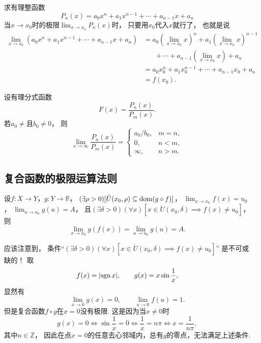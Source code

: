 \begin{example}\label{example:极限.有理整函数在一点的极限}
求有理整函数\[
	P_n(x) = a_0 x^n + a_1 x^{n-1} + \dotsb + a_{n-1} x + a_n
\]当\(x\to x_0\)时的极限\(\lim_{x\to x_0} P_n(x)\)时，
只要用\(x_0\)代入\(x\)就行了，
也就是说\begin{align*}
	\lim_{x \to x_0} (a_0 x^n + a_1 x^{n-1} + \dotsb + a_{n-1} x + a_n)
	&= a_0 \left(\lim_{x \to x_0} x\right)^n
		+ a_1 \left(\lim_{x \to x_0} x\right)^{n-1} \\
	&\hspace{20pt}+ \dotsb
		+ a_{n-1} \left(\lim_{x \to x_0} x\right)
		+ a_n \\
	&= a_0 x_0^n + a_1 x_0^{n-1} + \dotsb + a_{n-1} x_0 + a_n \\
	&= f(x_0).
\end{align*}
\end{example}

\begin{example}
设有理分式函数\[
	F(x) = \frac{P_n(x)}{P_m(x)}.
\]
若\(a_0\neq\)且\(b_0\neq0\)，
则\[
	\lim_{x\to\infty} \frac{P_n(x)}{P_m(x)}
	= \left\{ \begin{array}{cl}
		a_0/b_0, & m=n, \\
		0, & n<m, \\
		\infty, & n>m.
	\end{array} \right.
\]
\end{example}

\subsection{复合函数的极限运算法则}
\begin{theorem}
设\(f\colon X\to Y\)，\(g\colon Y\to\mathbb{R}\)，
\((\exists\rho>0)[\mathring{U}(x_0,\rho) \subseteq \operatorname{dom}(g \circ f)]\)，
\(\lim_{x \to x_0} f(x) = u_0\)，
\(\lim_{u \to u_0} g(u) = A\)，
且\((\exists\delta>0)(\forall x)[x\in\mathring{U}(x_0,\delta) \implies f(x)\neq u_0]\)，
则\[
	\lim_{x \to x_0} g(f(x))
	= \lim_{u \to u_0} g(u)
	= A.
\]
\end{theorem}

\begin{remark}
应该注意到，
条件“\((\exists\delta>0)(\forall x)[x\in\mathring{U}(x_0,\delta) \implies f(x)\neq u_0]\)”
是不可或缺的！
取\[
	f(x) = \abs{\operatorname{sgn} x}, \qquad
	g(x) = x \sin\frac1x,
\]
显然有\[
	\lim_{x\to0} g(x) = 0, \qquad
	\lim_{u\to0} f(u) = 1.
\]
但是复合函数\(f \circ g\)在\(x=0\)没有极限.
这是因为当\(x\neq0\)时\[
	g(x) = 0
	\iff
	\sin\frac1x = 0
	\iff
	\frac1x = n\pi
	\iff
	x = \frac1{n\pi},
\]
其中\(n\in\mathbb{Z}\)，
因此在点\(x=0\)的任意去心邻域内，总有\(g\)的零点，无法满足上述条件.
\end{remark}

